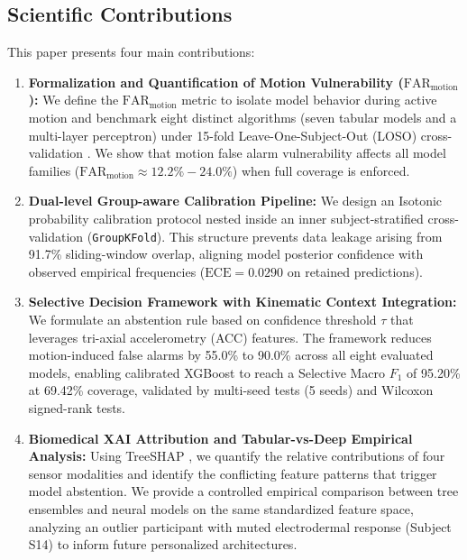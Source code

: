\documentclass[conference]{IEEEtran}
\begin{document}
\subsection{Scientific Contributions}
This paper presents four main contributions:
\begin{enumerate}
    \item \textbf{Formalization and Quantification of Motion Vulnerability ($\text{FAR}_{\text{motion}}$):} We define the $\text{FAR}_{\text{motion}}$ metric to isolate model behavior during active motion and benchmark eight distinct algorithms (seven tabular models and a multi-layer perceptron) under 15-fold Leave-One-Subject-Out (LOSO) cross-validation \cite{saeb2017need, little2017using}. We show that motion false alarm vulnerability affects all model families ($\text{FAR}_{\text{motion}} \approx 12.2\% - 24.0\%$) when full coverage is enforced.
    \item \textbf{Dual-level Group-aware Calibration Pipeline:} We design an Isotonic probability calibration protocol nested inside an inner subject-stratified cross-validation (\texttt{GroupKFold}). This structure prevents data leakage arising from 91.7\% sliding-window overlap, aligning model posterior confidence with observed empirical frequencies ($\text{ECE} = 0.0290$ on retained predictions).
    \item \textbf{Selective Decision Framework with Kinematic Context Integration:} We formulate an abstention rule based on confidence threshold $\tau$ that leverages tri-axial accelerometry (ACC) features. The framework reduces motion-induced false alarms by 55.0\% to 90.0\% across all eight evaluated models, enabling calibrated XGBoost to reach a Selective Macro $F_1$ of 95.20\% at 69.42\% coverage, validated by multi-seed tests (5 seeds) and Wilcoxon signed-rank tests.
    \item \textbf{Biomedical XAI Attribution and Tabular-vs-Deep Empirical Analysis:} Using TreeSHAP \cite{lundberg2020local}, we quantify the relative contributions of four sensor modalities and identify the conflicting feature patterns that trigger model abstention. We provide a controlled empirical comparison between tree ensembles and neural models on the same standardized feature space, analyzing an outlier participant with muted electrodermal response (Subject S14) to inform future personalized architectures.
\end{enumerate}

\end{document}
